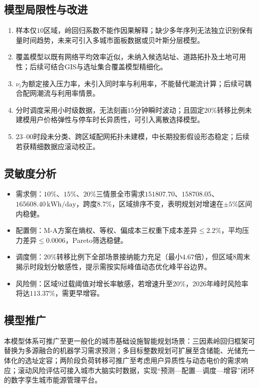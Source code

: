\documentclass[a4paper,12pt]{ctexart}
\begin{document}
\subsection{模型局限性与改进}
\begin{enumerate}[label=\arabic*.]
\item 样本仅$10$区域，岭回归系数不能作因果解释；缺少多年序列无法独立识别保有量时间趋势，未来可引入多城市面板数据或贝叶斯分层模型。
\item 覆盖模型以既有网络平均效率近似，未纳入候选站址、道路拓扑及土地可用性；后续可结合GIS与选址集合覆盖模型精细化。
\item $\nu_{i}$为额定接入压力率，未引入同时率与利用率，不能替代潮流计算；后续可耦合配网潮流与利用率情景。
\item 分时调度采用小时级数据，无法刻画$15$分钟瞬时波动；且固定$20\%$转移比例未建模用户价格弹性与停车时长异质性，可引入离散选择模型。
\item $23\text{--}00$时段未分类、跨区域配网拓扑未建模，中长期投影假设形态稳定；后续若获精细数据应滚动校正。
\end{enumerate}

\subsection{灵敏度分析}
\begin{itemize}
\item 需求侧：$10\%$、$15\%$、$20\%$三情景全市需求$151807.70$、$158708.05$、$165608.40\,\mathrm{kWh/day}$，跨度$8.7\%$，区域排序不变，表明规划对增速在$\pm5\%$区间内稳健。
\item 配置侧：M-A方案在熵权、等权、偏成本三权重下成本差异$\le2.2\%$，平均压力差异$\le0.0006$，Pareto筛选稳健。
\item 调度侧：$20\%$转移比例下全部场景接纳能力充足（最小$4.67$倍），但区域$8$周末揭示时段划分敏感性，提示需按实际峰值动态优化峰平谷边界。
\item 风险侧：区域$9$过载阈值对增长率敏感，若增速升至$20\%$，2026年峰时风险率将达$113.37\%$，需更早增容。
\end{itemize}

\subsection{模型推广}
本模型体系可推广至更一般化的城市基础设施智能规划场景：三因素岭回归框架可替换为多源融合的机器学习需求预测；多目标整数规划可扩展至含储能、光储充一体化的选址定容；两阶段负荷转移可推广至考虑用户异质性与动态电价的需求响应；滚动风险评估可接入城市大脑实时数据，实现“预测—配置—调度—增容”闭环的数字孪生城市能源管理平台。
\end{document}
